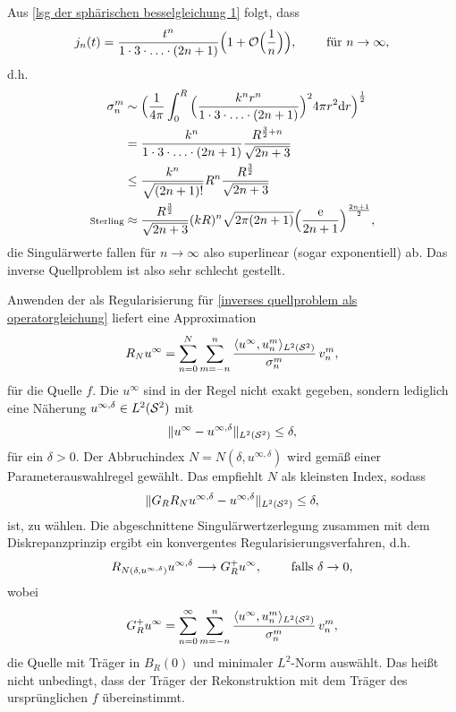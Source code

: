 Aus \eqref{lsg der sphärischen besselgleichung 1} folgt, dass
\begin{equation*}
	j_n(t)=\frac{t^n}{1\cdot3\cdot\ldots\cdot(2n+1)}\Big(1+\mathcal{O}\Big(\frac{1}{n}\Big)\Big),\qquad\text{ für }n\to\infty,
\end{equation*}
d.h.
\begin{align*}
	\sigma_n^m
	&\sim\Big(\frac{1}{4\pi}\int_0^R\Big(\frac{k^nr^n}{1\cdot3\cdot\ldots\cdot(2n+1)}\Big)^24\pi r^2\mathrm{d}r\Big)^\frac{1}{2}\\
	&=\frac{k^n}{1\cdot3\cdot\ldots\cdot(2n+1)}\frac{R^{\frac{3}{2}+n}}{\sqrt{2n+3}}\\
	&\leq\frac{k^n}{\sqrt{(2n+1)!}}R^n\frac{R^{\frac{3}{2}}}{\sqrt{2n+3}}\\
	\text{\scriptsize Sterling}
	&\approx\frac{R^\frac{3}{2}}{\sqrt{2n+3}}(kR)^n\sqrt{2\pi(2n+1)}\Big(\frac{\mathrm{e}}{2n+1}\Big)^\frac{2n+1}{2},
\end{align*}
die Singulärwerte fallen für \(n\to\infty\) also superlinear (sogar exponentiell) ab. Das inverse Quellproblem ist also sehr schlecht gestellt.\vspace{2mm}

Anwenden der  als Regularisierung für \eqref{inverses quellproblem als operatorgleichung} liefert eine Approximation
\begin{equation*}
	R_Nu^\infty=\sum_{n=0}^N\sum_{m=-n}^n\frac{\langle u^\infty, u_n^m\rangle_{L^2(\mathcal{S}^2)}}{\sigma_n^m}\,v_n^m,
\end{equation*}
für die Quelle \(f\). Die  \(u^\infty\) sind in der Regel nicht exakt gegeben, sondern lediglich eine Näherung \(u^{\infty,\delta}\in L^2(\mathcal{S}^2)\) mit
\begin{equation*}
	\|u^\infty-u^{\infty,\delta}\|_{L^2(\mathcal{S}^2)}\leq\delta,
\end{equation*}
für ein \(\delta>0\). Der Abbruchindex \(N=N(\delta,u^{\infty,\delta})\) wird gemäß einer Parameterauswahlregel gewählt. Das  empfiehlt \(N\) als kleinsten Index, sodass
\begin{equation*}
	\|G_RR_Nu^{\infty,\delta}-u^{\infty,\delta}\|_{L^2(\mathcal{S}^2)}\leq\delta,
\end{equation*}
ist, zu wählen. Die abgeschnittene Singulärwertzerlegung zusammen mit dem Diskrepanzprinzip ergibt ein konvergentes Regularisierungsverfahren, d.h.
\begin{equation*}
	R_{N(\delta,u^{\infty,\delta})}u^{\infty,\delta}\longrightarrow G_R^+u^\infty,\qquad\text{ falls }\delta\to0,
\end{equation*}
wobei
\begin{equation*}
	G_R^+u^\infty=\sum_{n=0}^\infty\sum_{m=-n}^n\frac{\langle u^\infty, u_n^m\rangle_{L^2(\mathcal{S}^2)}}{\sigma_n^m}\,v_n^m,
\end{equation*}
die Quelle mit Träger in \(B_R(0)\) und minimaler \(L^2\)-Norm auswählt. Das heißt nicht unbedingt, dass der Träger der Rekonstruktion mit dem Träger des ursprünglichen \(f\) übereinstimmt.\vspace{1.5mm}

